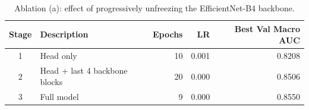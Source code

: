 \begin{table}
\caption{Ablation (a): effect of progressively unfreezing the EfficientNet-B4 backbone.}
\label{tab:table4a_progressive_finetuning}
\begin{tabular}{clrrr}
\toprule
Stage & Description & Epochs & LR & Best Val Macro AUC \\
\midrule
1 & Head only & 10 & 0.001 & 0.8208 \\
2 & Head + last 4 backbone blocks & 20 & 0.000 & 0.8506 \\
3 & Full model & 9 & 0.000 & 0.8550 \\
\bottomrule
\end{tabular}
\end{table}
